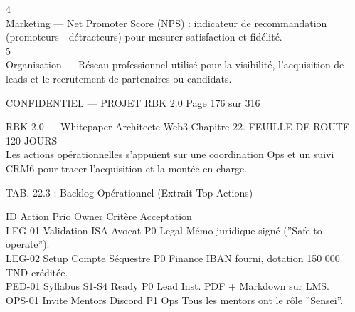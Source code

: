 4\\
Marketing — Net Promoter Score (NPS) : indicateur de recommandation (promoteurs - détracteurs) pour mesurer satisfaction et fidélité.\\
5\\
Organisation — Réseau professionnel utilisé pour la visibilité, l’acquisition de leads et le recrutement de partenaires ou candidats.\\
\vspace{0.5em}
\vspace{0.5em}
\begin{confidential}CONFIDENTIEL — PROJET RBK 2.0                                           Page 176 sur 316\end{confidential}
RBK 2.0 — Whitepaper Architecte Web3                                                                              Chapitre 22. FEUILLE DE ROUTE 120 JOURS\\
\vspace{0.5em}
\vspace{0.5em}
Les actions opérationnelles s’appuient sur une coordination Ops et un suivi CRM6 pour tracer l’acquisition et la montée en charge.\\
\vspace{0.5em}
\begin{center}\begin{tabular}TAB. 22.3 : Backlog Opérationnel (Extrait Top Actions)\end{tabular}\end{center}
\vspace{0.5em}
\vspace{0.5em}
ID        Action                     Prio Owner        Critère Acceptation\\
\vspace{0.5em}
LEG-01 Validation ISA Avocat          P0 Legal         Mémo juridique signé (”Safe to operate”).\\
\vspace{0.5em}
LEG-02 Setup Compte Séquestre P0 Finance               IBAN fourni, dotation 150 000 TND créditée.\\
\vspace{0.5em}
PED-01 Syllabus S1-S4 Ready           P0 Lead Inst. PDF + Markdown sur LMS.\\
\vspace{0.5em}
OPS-01 Invite Mentors Discord         P1 Ops           Tous les mentors ont le rôle ”Sensei”.\\
\vspace{0.5em}
\vspace{0.5em}
